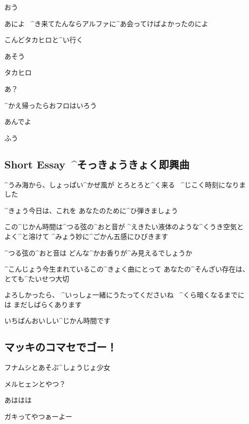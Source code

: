\M おう

\page
\T あによ
\ ^{き}{来}てたんならアルファに^{あ}{会}ってけばよかったのによ

\M こんどタカヒロと^{い}{行}く

\T あそう

\page
\M タカヒロ

\T あ？

\M ^{かえ}{帰}ったらおフロはいろう

\T あんでよ

\A ふう


\subsection{Short Essay\ ^{そっきょうきょく}{即興曲}}

\page[127]
\A ^{うみ}{海}から、しょっぱい^{かぜ}{風}が
とろとろと^{く}{来}る
\ ^{じこく}{時刻}になりました

\A ^{きょう}{今日}は、これを
あなたのために^{ひ}{弾}きましょう

\page
\A この^{じかん}{時間}は^{つる}{弦}の^{おと}{音}が
^{えきたい}{液体}のような^{くうき}{空気}とよく^{と}{溶}けて
^{みょう}{妙}に^{ごかん}{五感}にひびきます

\page
\A ^{つる}{弦}の^{おと}{音}は
どんな^{かお}{香}りが^{み}{見}えるでしょうか

\A ^{こんじょう}{今生}まれているこの^{きょく}{曲}にとって
あなたの^{そんざい}{存在}は、とても^{たいせつ}{大切}

\page
\A よろしかったら、
^{いっしょ}{一緒}にうたってくださいね
\ ^{くら}{暗}くなるまでには
まだしばらくあります

\A いちばんおいしい^{じかん}{時間}です


\subsection{マッキのコマセでゴー！}
\Y フナムシとあそぶ^{しょうじょ}{少女}

\Y メルヒェンとやつ？

\M あははは

\Y ガキってやつぁーよー
